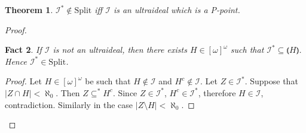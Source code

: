\documentclass[12pt]{amsart}
\theoremstyle{plain}
\newtheorem{theorem}{Theorem}[section]
\newtheorem{fact}[theorem]{Fact}
\theoremstyle{definition}
\theoremstyle{remark}
\newcommand{\infsub}{[\omega]^{\omega}}
\newcommand{\calI}{\mathcal{I}}
\newcommand{\Split}{\mathrm{Split}}
\newcommand{\lNawiasik}{\lParen}
\newcommand{\rNawiasik}{\rParen}
\begin{document}
\begin{theorem}
  $\calI^* \not\in \Split$ iff $\calI$ is an ultraideal
which is a P-point.
\end{theorem}
\begin{proof}

  \begin{fact}
    If $\calI$ is not an ultraideal, then
    there exists $H \in \infsub$ such that
    $\calI^* \subseteq \lNawiasik H \rNawiasik$.
    Hence $\calI^* \in \Split$.
  \end{fact}
  \begin{proof}
    Let $H\in\infsub$ be such that $H\not\in\calI$
    and $H^c \not\in\calI$. Let $Z \in \calI^*$.
    Suppose that $|Z \cap H| < \aleph_0$.
    Then $Z\subseteq^* H^c$. Since $Z\in\calI^*$,
    $H^c\in\calI^*$, therefore $H\in\calI$, contradiction.
    Similarly in the case $|Z\setminus H| < \aleph_0$.
  \end{proof}


\end{proof}

\printbibliography
\end{document}
